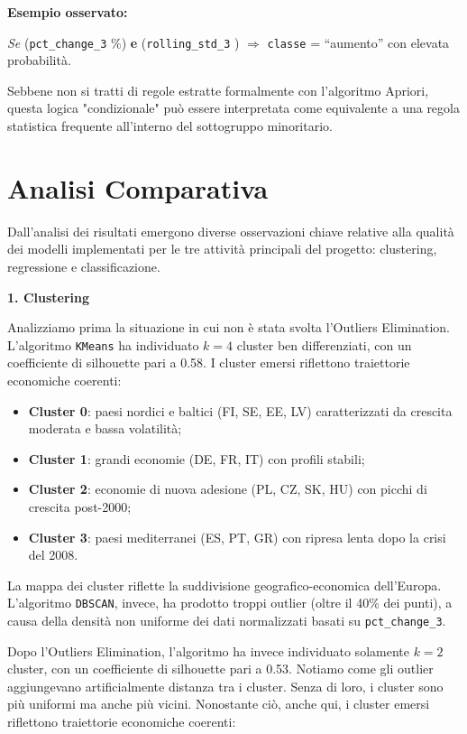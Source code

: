 \documentclass[conference]{IEEEtran}
\begin{document}
\noindent\textbf{Esempio osservato:}

{\centering \textit{Se} (\texttt{pct\_change\_3} \%) \textbf{ e } (\texttt{rolling\_std\_3} ) $\Rightarrow$ \texttt{classe} = “aumento” con elevata probabilità.}

Sebbene non si tratti di regole estratte formalmente con l’algoritmo Apriori, questa logica "condizionale" può essere interpretata come equivalente a una regola statistica frequente all’interno del sottogruppo minoritario.

\section*{\Large \textbf{Analisi Comparativa}}

Dall’analisi dei risultati emergono diverse osservazioni chiave relative alla qualità dei modelli implementati per le tre attività principali del progetto: clustering, regressione e classificazione.

\vspace{1em}\noindent\textbf{1. Clustering}

Analizziamo prima la situazione in cui non è stata svolta l'Outliers Elimination. L’algoritmo \texttt{KMeans} ha individuato $k = 4$ cluster ben differenziati, con un coefficiente di silhouette pari a 0.58. I cluster emersi riflettono traiettorie economiche coerenti:

\begin{itemize}
  \item \textbf{Cluster 0}: paesi nordici e baltici (FI, SE, EE, LV) caratterizzati da crescita moderata e bassa volatilità;
  \item \textbf{Cluster 1}: grandi economie (DE, FR, IT) con profili stabili;
  \item \textbf{Cluster 2}: economie di nuova adesione (PL, CZ, SK, HU) con picchi di crescita post-2000;
  \item \textbf{Cluster 3}: paesi mediterranei (ES, PT, GR) con ripresa lenta dopo la crisi del 2008.
\end{itemize}
La mappa dei cluster riflette la suddivisione geografico-economica dell’Europa. L’algoritmo \texttt{DBSCAN}, invece, ha prodotto troppi outlier (oltre il 40\% dei punti), a causa della densità non uniforme dei dati normalizzati basati su \texttt{pct\_change\_3}. 

Dopo l'Outliers Elimination, l’algoritmo ha invece individuato solamente $k = 2$ cluster, con un coefficiente di silhouette pari a 0.53. Notiamo come gli outlier aggiungevano artificialmente distanza tra i cluster. Senza di loro, i cluster sono più uniformi ma anche più vicini. Nonostante ciò, anche qui, i cluster emersi riflettono traiettorie economiche coerenti:
\end{document}
